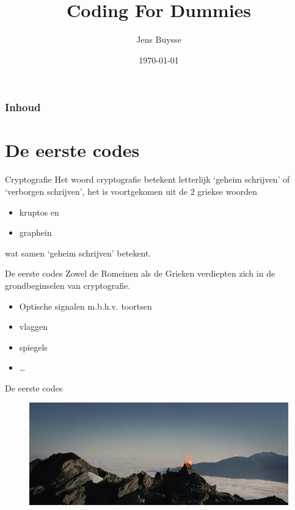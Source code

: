 \documentclass{beamer}
\title[Intro]{Coding For Dummies}
\author{Jens {Buysse}}
\date{\today}
\begin{document}

\HoGentLogo

\titleframe


\begin{frame}
  \frametitle{Inhoud}

  \tableofcontents
\end{frame}


\section{De eerste codes}
\begin{frame}{Cryptografie}
	Het woord \textcolor{HoGentBlue}{cryptografie} betekent letterlijk  \textcolor{HoGentBlue}{‘geheim schrijven’} of  \textcolor{HoGentBlue}{‘verborgen schrijven’}, het is voortgekomen uit de 2 griekse woorden 
	\begin{itemize}
		\item kruptos en
		\item graphein
	\end{itemize}
	 wat samen ‘geheim schrijven’ betekent.
\end{frame}

\begin{frame}{De eerste codes}
	Zowel de Romeinen als de Grieken verdiepten zich in de grondbeginselen van cryptografie. 
	
	\begin{itemize}
		\item Optische signalen m.b.h.v. toortsen
		\item vlaggen
		\item spiegels
		\item \dots
	\end{itemize}
\end{frame}

\begin{frame}{De eerste codes}
	\begin{figure}
		\includegraphics[width=\textwidth]{img/toorts.jpg}
	\end{figure}
\end{frame}
\end{document}
